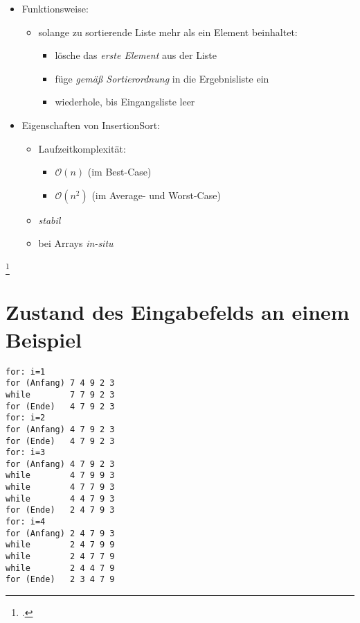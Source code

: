 \documentclass{lehramt-informatik-haupt}
\begin{document}
\begin{itemize}
\item Funktionsweise:

\begin{itemize}
\item solange zu sortierende Liste mehr als ein Element beinhaltet:

\begin{itemize}
\item lösche das \emph{erste Element} aus der Liste
\item füge \emph{gemäß Sortierordnung} in die Ergebnisliste ein
\item wiederhole, bis Eingangsliste leer
\end{itemize}

\end{itemize}

\item Eigenschaften von InsertionSort:

\begin{itemize}
\item Laufzeitkomplexität:

\begin{itemize}
\item $\mathcal{O}(n)$ (im Best-Case)
\item $\mathcal{O}(n^2)$ (im Average- und Worst-Case)
\end{itemize}

\item \emph{stabil}
\item bei Arrays \emph{in-situ}
\end{itemize}

\end{itemize}

\footcite[Seite 125 - 127]{saake}

\section{Zustand des Eingabefelds an einem Beispiel}

\begin{verbatim}
for: i=1
for (Anfang) 7 4 9 2 3
while        7 7 9 2 3
for (Ende)   4 7 9 2 3
for: i=2
for (Anfang) 4 7 9 2 3
for (Ende)   4 7 9 2 3
for: i=3
for (Anfang) 4 7 9 2 3
while        4 7 9 9 3
while        4 7 7 9 3
while        4 4 7 9 3
for (Ende)   2 4 7 9 3
for: i=4
for (Anfang) 2 4 7 9 3
while        2 4 7 9 9
while        2 4 7 7 9
while        2 4 4 7 9
for (Ende)   2 3 4 7 9
\end{verbatim}



\literatur
\end{document}
